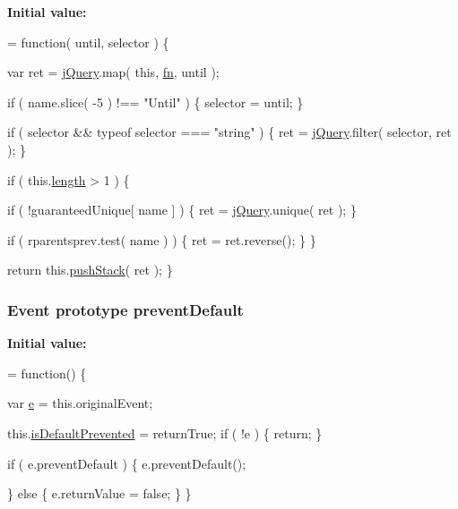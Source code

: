 {\bfseries Initial value\-:}
\begin{DoxyCode}
= \textcolor{keyword}{function}( until, selector ) \{


        var ret = \hyperlink{jquery-1_810_82-vsdoc_8js_add5237586d970a38a81f990e8eb28c6c}{jQuery}.map( \textcolor{keyword}{this}, \hyperlink{jquery-1_810_82-vsdoc_8js_acef6bdaf6b9b20fdcca1ea86f0902c3b}{fn}, until );

        \textcolor{keywordflow}{if} ( name.slice( -5 ) !== \textcolor{stringliteral}{"Until"} ) \{
            selector = until;
        \}

        \textcolor{keywordflow}{if} ( selector && typeof selector === \textcolor{stringliteral}{"string"} ) \{
            ret = \hyperlink{jquery-1_810_82-vsdoc_8js_add5237586d970a38a81f990e8eb28c6c}{jQuery}.filter( selector, ret );
        \}

        \textcolor{keywordflow}{if} ( this.\hyperlink{jquery-1_810_82-vsdoc_8js_aa7de35d58da66d9944ab9cbe82c19640}{length} > 1 ) \{
            
            \textcolor{keywordflow}{if} ( !guaranteedUnique[ name ] ) \{
                ret = \hyperlink{jquery-1_810_82-vsdoc_8js_add5237586d970a38a81f990e8eb28c6c}{jQuery}.unique( ret );
            \}

            
            \textcolor{keywordflow}{if} ( rparentsprev.test( name ) ) \{
                ret = ret.reverse();
            \}
        \}

        \textcolor{keywordflow}{return} this.\hyperlink{jquery-1_810_82-vsdoc_8js_afc3a7db1ef2b526338c06c07cecccd44}{pushStack}( ret );
    \}
\end{DoxyCode}
\hypertarget{jquery-1_810_82-vsdoc_8js_aafc4d39414b638f56c88573e5f8b4fb4}{
\subsubsection[{prevent\-Default}]{ {\bf Event} {\bf prototype} prevent\-Default}}\label{jquery-1_810_82-vsdoc_8js_aafc4d39414b638f56c88573e5f8b4fb4}
{\bfseries Initial value\-:}
\begin{DoxyCode}
= \textcolor{keyword}{function}() \{


        var \hyperlink{jquery-1_810_82_8min_8js_a2c038346d47955cbe2cb91e338edd7e1}{e} = this.originalEvent;

        this.\hyperlink{jquery-1_810_82-vsdoc_8js_af36c584d7af0deb379b8d6e3116775cc}{isDefaultPrevented} = returnTrue;
        \textcolor{keywordflow}{if} ( !e ) \{
            \textcolor{keywordflow}{return};
        \}

        
        \textcolor{keywordflow}{if} ( e.preventDefault ) \{
            e.preventDefault();

        
        
        \} \textcolor{keywordflow}{else} \{
            e.returnValue = \textcolor{keyword}{false};
        \}
    \}
\end{DoxyCode}
